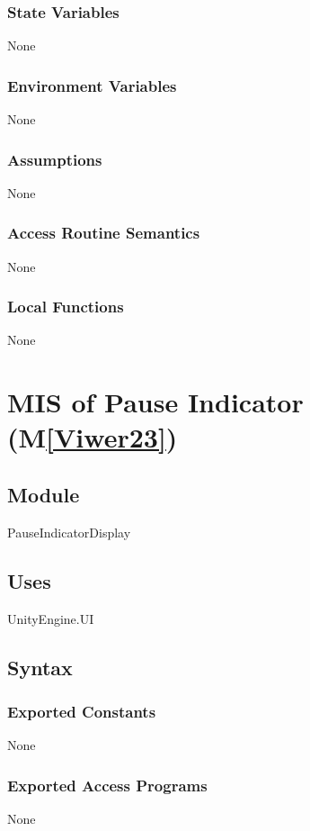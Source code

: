 \documentclass[12pt, titlepage]{article}
\newcommand{\mref}[1]{M\ref{#1}}
\begin{document}
\subsubsection{State Variables}
None
\subsubsection{Environment Variables}
None
\subsubsection{Assumptions}
None
\subsubsection{Access Routine Semantics}
None
\subsubsection{Local Functions}
None

\newpage


\section{MIS of Pause Indicator (\mref{Viwer23})} 

\subsection{Module}
PauseIndicatorDisplay

\subsection{Uses}
UnityEngine.UI 

\subsection{Syntax}

\subsubsection{Exported Constants}
None
\subsubsection{Exported Access Programs}
None
\end{document}

